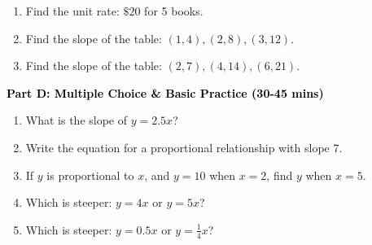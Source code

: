 \documentclass[12pt, letterpaper, fleqn]{article}
\newcommand{\blank}{\underline{\hspace{2.2cm}}}
\begin{document}
\begin{enumerate}[itemsep=2.5cm, leftmargin=0.6cm, resume]
\item Find the unit rate: $\$20$ for 5 books. \blank
\item Find the slope of the table: $(1, 4), (2, 8), (3, 12)$. \blank
\item Find the slope of the table: $(2, 7), (4, 14), (6, 21)$. \blank
\end{enumerate}

\newpage

\begin{tcolorbox}[colback=customteal!20]
\large\textcolor{black}{\textbf{Part D: Multiple Choice \& Basic Practice (30-45 mins)}}
\end{tcolorbox}

\vspace{3mm}

\begin{enumerate}[itemsep=2.5cm, leftmargin=0.6cm, resume]
\item What is the slope of $y = 2.5x$? \blank
\item Write the equation for a proportional relationship with slope 7. \blank
\item If $y$ is proportional to $x$, and $y = 10$ when $x = 2$, find $y$ when $x = 5$. \blank
\item Which is steeper: $y = 4x$ or $y = 5x$? \blank
\item Which is steeper: $y = 0.5x$ or $y = \frac{1}{4}x$? \blank
\end{enumerate}
\end{document}
